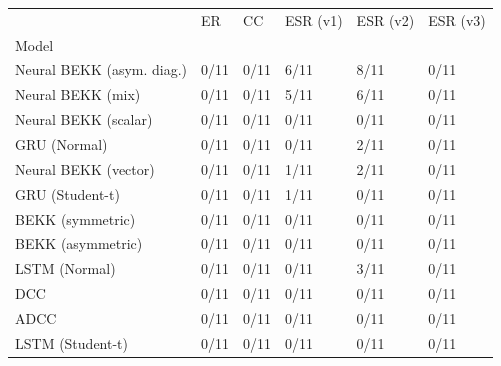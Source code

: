\begin{tabular}{llllll}
\toprule
 & ER & CC & ESR (v1) & ESR (v2) & ESR (v3) \\
Model &  &  &  &  &  \\
\midrule
Neural BEKK (asym. diag.) & 0/11 & 0/11 & 6/11 & 8/11 & 0/11 \\
Neural BEKK (mix) & 0/11 & 0/11 & 5/11 & 6/11 & 0/11 \\
Neural BEKK (scalar) & 0/11 & 0/11 & 0/11 & 0/11 & 0/11 \\
GRU (Normal) & 0/11 & 0/11 & 0/11 & 2/11 & 0/11 \\
Neural BEKK (vector) & 0/11 & 0/11 & 1/11 & 2/11 & 0/11 \\
GRU (Student-t) & 0/11 & 0/11 & 1/11 & 0/11 & 0/11 \\
BEKK (symmetric) & 0/11 & 0/11 & 0/11 & 0/11 & 0/11 \\
BEKK (asymmetric) & 0/11 & 0/11 & 0/11 & 0/11 & 0/11 \\
LSTM (Normal) & 0/11 & 0/11 & 0/11 & 3/11 & 0/11 \\
DCC & 0/11 & 0/11 & 0/11 & 0/11 & 0/11 \\
ADCC & 0/11 & 0/11 & 0/11 & 0/11 & 0/11 \\
LSTM (Student-t) & 0/11 & 0/11 & 0/11 & 0/11 & 0/11 \\
\bottomrule
\end{tabular}
